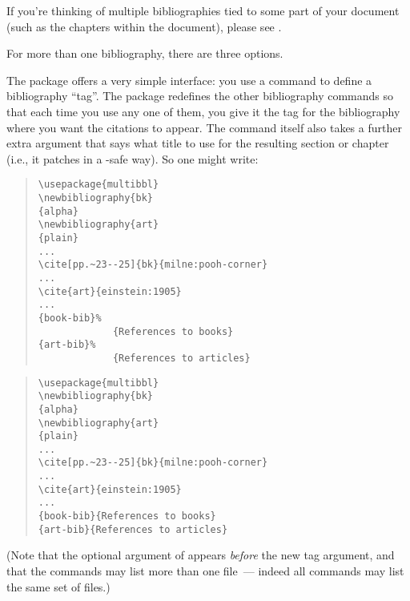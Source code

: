 
If you're thinking of multiple bibliographies tied to some part of
your document (such as the chapters within the document), please see
.

For more than one bibliography, there are three options.

The  package offers a very simple interface: you use
a command  to define a bibliography ``tag''.  The package
redefines the other bibliography commands so that each time you use any one
of them, you give it the tag for the bibliography where you want the
citations to appear.  The  command itself also takes
a further extra argument that says what title to use for the resulting
section or chapter (i.e., it patches
\nothtml{~---} in a
-safe way).  So one might write:
\begin{narrowversion}
\begin{quote}
\begin{verbatim}
\usepackage{multibbl}
\newbibliography{bk}
{alpha}
\newbibliography{art}
{plain}
...
\cite[pp.~23--25]{bk}{milne:pooh-corner}
...
\cite{art}{einstein:1905}
...
{book-bib}%
             {References to books}
{art-bib}%
             {References to articles}
\end{verbatim}
\end{quote}
\end{narrowversion}
\begin{wideversion}
\begin{quote}
\begin{verbatim}
\usepackage{multibbl}
\newbibliography{bk}
{alpha}
\newbibliography{art}
{plain}
...
\cite[pp.~23--25]{bk}{milne:pooh-corner}
...
\cite{art}{einstein:1905}
...
{book-bib}{References to books}
{art-bib}{References to articles}
\end{verbatim}
\end{quote}
\end{wideversion}
(Note that the optional argument of  appears \emph{before} the
new tag argument, and that the  commands may list
more than one  file~--- indeed all  commands
may list the same set of files.)

